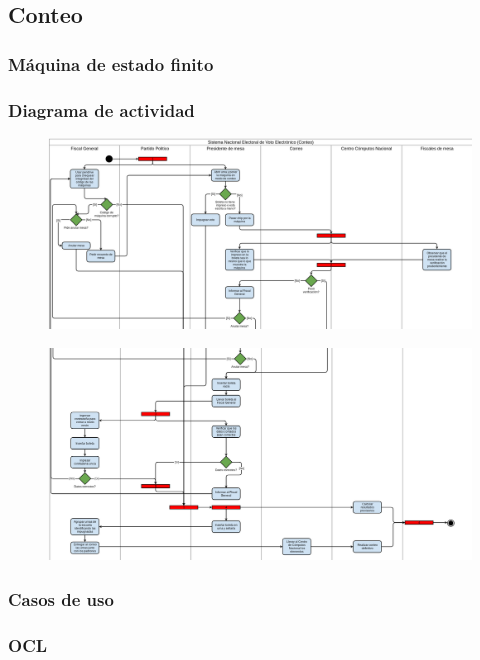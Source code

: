 \subsection{Conteo}

\subsubsection{Máquina de estado finito}

\subsubsection{Diagrama de actividad}
\begin{figure}[h!]
\centering
\includegraphics[scale=0.5]{imagenes/actividad/actividadConteo1}
\end{figure}

\begin{figure}[h!]
\centering
\includegraphics[scale=0.5]{imagenes/actividad/actividadConteo2}
\end{figure}


\subsubsection{Casos de uso}


\subsubsection{OCL}